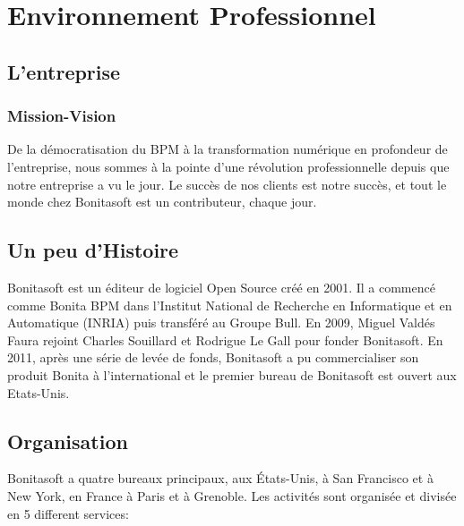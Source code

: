 \section{Environnement Professionnel}
\subsection{L'entreprise}
\subsubsection{Mission-Vision}
De la démocratisation du BPM à la transformation numérique en profondeur de l'entreprise, nous sommes à la pointe d'une révolution professionnelle depuis que notre entreprise a vu le jour.
Le succès de nos clients est notre succès, et tout le monde chez Bonitasoft est un contributeur, chaque jour.
\cite{Bonitasoft2017BONITA}

\subsection{Un peu d'Histoire}
Bonitasoft est un éditeur de logiciel Open Source créé en 2001. Il a commencé comme Bonita BPM dans l'Institut National de Recherche en Informatique et en Automatique (INRIA) puis transféré au Groupe Bull.
En 2009, Miguel Valdés Faura rejoint Charles Souillard et Rodrigue Le Gall pour fonder Bonitasoft.
En 2011, après une série de levée de fonds, Bonitasoft a pu commercialiser son produit Bonita à l'international et le premier bureau de Bonitasoft est ouvert aux Etats-Unis.\cite{wikipedia_2018}

\subsection{Organisation}
Bonitasoft a quatre bureaux principaux, aux États-Unis, à San Francisco et à New York, en France à Paris et à Grenoble.
Les activités sont organisée et divisée en 5 different services:

\begin{center}
\end{center}








